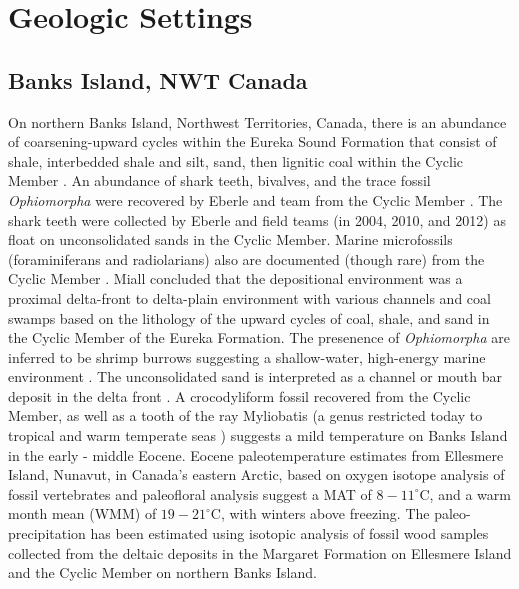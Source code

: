 \documentclass[]{rsos}%
\begin{document}
\section{Geologic Settings}

\subsection{Banks Island, NWT Canada}
On northern Banks Island, Northwest Territories, Canada, there is an abundance of coarsening-upward cycles within the Eureka Sound Formation that consist of shale, interbedded shale and silt, sand, then lignitic coal within the Cyclic Member \cite{Padilla2014}. 
An abundance of shark teeth, bivalves, and the trace fossil \emph{Ophiomorpha} were recovered by Eberle and team from the Cyclic Member \cite{Padilla2014}. 
The shark teeth were collected by Eberle and field teams (in 2004, 2010, and 2012) as float on unconsolidated sands in the Cyclic Member. 
Marine microfossils (foraminiferans and radiolarians) also are documented (though rare) from the Cyclic Member \cite{Miall1979}. 
Miall \cite{Miall1979} concluded that the depositional environment was a proximal delta-front to delta-plain environment with various channels and coal swamps based on the lithology of the upward cycles of coal, shale, and sand in the Cyclic Member of the Eureka Formation. 
The presenence of \emph{Ophiomorpha} \cite{Miall1979, Eberle2012} are inferred to be shrimp burrows suggesting a shallow-water, high-energy marine environment \cite{frey1978ophiomorpha}. 
The unconsolidated sand is interpreted as a channel or mouth bar deposit in the delta front \cite{Padilla2014}. 
A crocodyliform fossil recovered from the Cyclic Member, as well as a tooth of the ray Myliobatis (a genus restricted today to tropical and warm temperate seas \cite{Padilla2014}) suggests a mild temperature on Banks Island in the early - middle Eocene. 
Eocene paleotemperature estimates from Ellesmere Island, Nunavut, in Canada's eastern Arctic, based on oxygen isotope analysis of fossil vertebrates \cite{eberle2010seasonal} and paleofloral analysis \cite{west2015arctic, west2020paleobotanical} suggest a MAT of $8-11^\circ$C, and a warm month mean (WMM) of $19-21^\circ$C, with winters above freezing. 
The paleo-precipitation has been estimated using isotopic analysis of fossil wood samples collected from the deltaic deposits in the Margaret Formation on Ellesmere Island and the Cyclic Member on northern Banks Island. 
\end{document}
